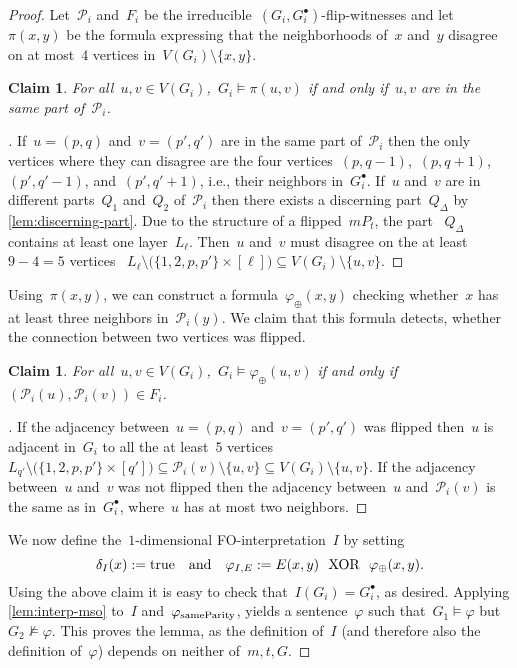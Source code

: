 \documentclass[11pt]{article}      \usepackage[margin=1in]{geometry}  \usepackage{microtype}
\newtheorem{claim}[theorem]{Claim}
\theoremstyle{definition}
\renewcommand{\phi}{\varphi}
\newcommand{\XOR}{\textnormal{~~XOR~~}}
\newcommand{\PP}{\mathcal{P}}
\newenvironment{claimproof}[1][\proofname]{\renewcommand{\qedsymbol}{$\blacksquare$}\begin{proof}[#1]}{\end{proof}}
\begin{document}
\begin{proof}
    Let~$\PP_i$ and~$F_i$ be the irreducible~$(G_i,G^\bullet_i)$-flip-witnesses
    and let~$\pi(x,y)$ be the formula expressing that the neighborhoods of~$x$ and~$y$ disagree on at most~$4$ vertices in~$V(G_i) \setminus \{x,y\}$.
    \begin{claim}
        For all~$u,v \in V(G_i)$,~$G_i \models \pi(u,v)$ if and only if~$u,v$ are in the same part of~$\PP_i$.
    \end{claim}
    \begin{claimproof}
        If~$u = (p,q)$ and~$v = (p',q')$ are in the same part of~$\PP_i$ then the only vertices where they can disagree are the four vertices~$(p,q-1)$,~$(p,q+1)$,~$(p',q'-1)$, and~$(p',q'+1)$, i.e., their neighbors in~$G^\bullet_i$.
        If~$u$ and~$v$ are in different parts~$Q_1$ and~$Q_2$ of~$\PP_i$ then there exists a discerning part~$Q_\Delta$ by
        \cref{lem:discerning-part}.
        Due to the structure of a flipped~$mP_t$, the part
       ~$Q_\Delta$ contains at least one layer~$L_\ell$.
        Then~$u$ and~$v$ must disagree  on the at least~$9-4=5$ vertices 
       ~$L_\ell \setminus \big(\{1,2,p,p'\} \times [\ell]\big) \subseteq V(G_i) \setminus \{ u,v \}$.
    \end{claimproof}
    Using~$\pi(x,y)$, we can construct a formula~$\phi_\oplus(x,y)$ checking whether~$x$ has at least three neighbors in~$\PP_i(y)$.
    We claim that this formula detects, whether the connection between two vertices was flipped.
    \begin{claim}
        For all~$u,v \in V(G_i)$,~$G_i \models \phi_\oplus(u,v)$ if and only if~$(\PP_i(u),\PP_i(v)) \in F_i$.
    \end{claim}
    \begin{claimproof}
        If the adjacency between~$u = (p,q)$ and~$v = (p',q')$ was flipped then~$u$ is adjacent in~$G_i$ to all the at 
        least~$5$ vertices
       ~$L_{q'} \setminus \big(\{1,2,p,p'\} \times [q']\big)\subseteq \PP_i(v) \setminus \{ u,v \} \subseteq V(G_i) \setminus \{ u,v \}$.
        If the adjacency between~$u$ and~$v$ was not flipped then the adjacency between~$u$ and~$\PP_i(v)$ is the same as in~$G_i^\bullet$, where~$u$ has at most two neighbors.
    \end{claimproof}
    We now define the~$1$-dimensional FO-interpretation~$I$ by setting 
    \[
        \delta_I(x) := \mathrm{true} \quad\text{and}\quad \phi_{I,E} := E(x,y) \XOR \phi_\oplus(x,y).    
    \]
    Using the above claim it is easy to check that~$I(G_i) = G_i^\bullet$, as desired.
    Applying \cref{lem:interp-mso} to~$I$ and~$\sameparity$, yields a sentence~$\phi$ such that~$G_1 \models \phi$ but~$G_2 \not \models \phi$.
    This proves the lemma, as the definition of~$I$ (and therefore also the definition of~$\phi$) depends on neither of~$m,t,G$.
\end{proof}
\end{document}
